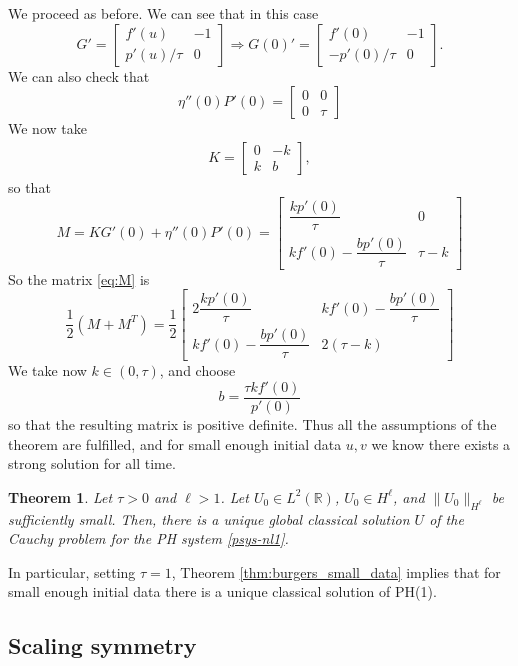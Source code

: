 \documentclass{article}
\theoremstyle{plain}
\newtheorem{theorem}{Theorem}
\theoremstyle{definition}
\numberwithin{theorem}{section}
\begin{document}
We proceed as before. We can see that in this case
$$
G'=\left[\begin{array}{cc}
f'(u)&  -1\\
p'(u)/\tau & 0
\end{array}\right]\Rightarrow G(0)'=\left[\begin{array}{cc}
f'(0)&  -1\\
-p'(0)/\tau & 0
\end{array}\right].
$$
We can also check that 
$$
\eta''(0)P'(0) = \left[\begin{array}{cc}
0&  0\\
0 &  \tau
\end{array}\right]
$$
We now take
\begin{align*}
    K = \begin{bmatrix} 0 & -k \\ k & b \end{bmatrix},
\end{align*}
so that
$$
M=KG'(0) + \eta''(0)P'(0) = 
  \left[\begin{array}{cc}
\dfrac{kp'(0)}{\tau} &  0\\
kf'(0) -\dfrac{bp'(0)}{\tau} &   \tau -k
\end{array}\right] 
$$
So  the matrix \eqref{eq:M} is 
$$
\dfrac{1}{2}(M+M^T) =\dfrac{1}{2}\left[\begin{array}{cc}
2\dfrac{kp'(0)}{\tau} &  kf'(0) -\dfrac{bp'(0)}{\tau} \\
kf'(0) -\dfrac{bp'(0)}{\tau} &   2(\tau -k)
\end{array}\right] 
$$
We take now $k\in (0,\tau)$, and choose
$$
b=  \dfrac{\tau k f'(0)}{p'(0)}
$$
so that the resulting matrix is positive definite.  Thus all the assumptions of the theorem are fulfilled, and for small enough initial data $u, v$ we know there exists
a strong solution for all time.

\begin{theorem}
\label{thm:Psys_small_data}
    Let
    $\tau > 0$ and $\ell > 1$.
    Let $U_0 \in L^2(\mathbb{R})$,
    $U_0 \in H^\ell$, and $\|U_0\|_{H^\ell}$ be sufficiently small.
    Then, there is a unique global classical solution $U$ of the Cauchy problem for the PH system \eqref{psys-nl1}.
\end{theorem}
In particular, setting $\tau=1$, Theorem \ref{thm:burgers_small_data} implies that for small
enough initial data there is a unique classical  solution of PH(1).
 

\subsection{Scaling symmetry}
\end{document}
